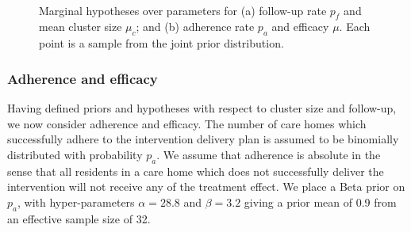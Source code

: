 \documentclass{article} %
\begin{document}
\begin{figure}
   \centering
   \quad
   \\
   \caption{Marginal hypotheses over parameters for (a) follow-up rate $p_{f}$ and mean cluster size $\mu_{c}$; and (b) adherence rate $p_{a}$ and efficacy $\mu$. Each point is a sample from the joint prior distribution.}
   \label{fig:hyps}
\end{figure}

\subsubsection{Adherence and efficacy}

Having defined priors and hypotheses with respect to cluster size and follow-up, we now consider adherence and efficacy. The number of care homes which successfully adhere to the intervention delivery plan is assumed to be binomially distributed with probability $p_{a}$. We assume that adherence is absolute in the sense that all residents in a care home which does not successfully deliver the intervention will not receive any of the treatment effect. We place a Beta prior on $p_{a}$, with hyper-parameters $\alpha = 28.8$ and $\beta = 3.2$ giving a prior mean of 0.9 from an effective sample size of 32.
\end{document}
